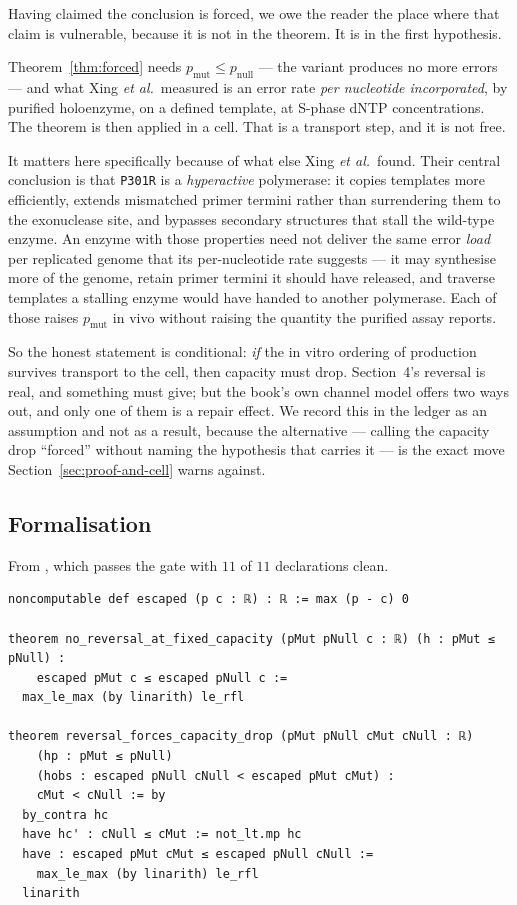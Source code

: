 \begin{remark}\label{rem:transport}
Having claimed the conclusion is forced, we owe the reader the place where that
claim is vulnerable, because it is not in the theorem. It is in the first
hypothesis.

Theorem~\ref{thm:forced} needs $p_{\mathrm{mut}} \le p_{\mathrm{null}}$ --- the
variant produces no more errors --- and what Xing \emph{et al.}\ measured is an
error rate \emph{per nucleotide incorporated}, by purified holoenzyme, on a
defined template, at S-phase dNTP concentrations. The theorem is then applied in
a cell. That is a transport step, and it is not free.

It matters here specifically because of what else Xing \emph{et al.}\ found. Their
central conclusion is that \texttt{P301R} is a \emph{hyperactive} polymerase: it
copies templates more efficiently, extends mismatched primer termini rather than
surrendering them to the exonuclease site, and bypasses secondary structures that
stall the wild-type enzyme. An enzyme with those properties need not deliver the
same error \emph{load} per replicated genome that its per-nucleotide rate
suggests --- it may synthesise more of the genome, retain primer termini it should
have released, and traverse templates a stalling enzyme would have handed to
another polymerase. Each of those raises $p_{\mathrm{mut}}$ in vivo without
raising the quantity the purified assay reports.

So the honest statement is conditional: \emph{if} the in vitro ordering of
production survives transport to the cell, then capacity must drop. Section~4's
reversal is real, and something must give; but the book's own channel model
offers two ways out, and only one of them is a repair effect. We record this in
the ledger as an assumption and not as a result, because the alternative ---
calling the capacity drop ``forced'' without naming the hypothesis that carries
it --- is the exact move Section~\ref{sec:proof-and-cell} warns against.
\end{remark}

\subsection{Formalisation}

From , which passes the gate with $11$ of
$11$ declarations clean.

\begin{lstlisting}
noncomputable def escaped (p c : ℝ) : ℝ := max (p - c) 0

theorem no_reversal_at_fixed_capacity (pMut pNull c : ℝ) (h : pMut ≤ pNull) :
    escaped pMut c ≤ escaped pNull c :=
  max_le_max (by linarith) le_rfl

theorem reversal_forces_capacity_drop (pMut pNull cMut cNull : ℝ)
    (hp : pMut ≤ pNull)
    (hobs : escaped pNull cNull < escaped pMut cMut) :
    cMut < cNull := by
  by_contra hc
  have hc' : cNull ≤ cMut := not_lt.mp hc
  have : escaped pMut cMut ≤ escaped pNull cNull :=
    max_le_max (by linarith) le_rfl
  linarith
\end{lstlisting}

